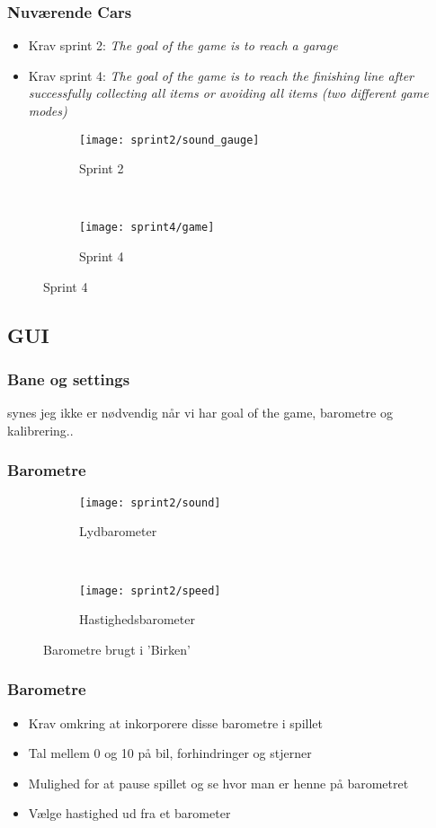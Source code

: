 \begin{frame}
\frametitle{Nuværende Cars}
\begin{itemize}
\item Krav sprint 2: \textit{The goal of the game is to reach a garage}
\item Krav sprint 4: \textit{The goal of the game is to reach the finishing line
after successfully collecting all items or avoiding
all items (two different game modes)}
\end{itemize}
\begin{figure}
\begin{subfigure}[b]{0.4\textwidth}
\texttt{[image: sprint2/sound\_gauge]}
\caption{Sprint 2}
\end{subfigure}
~
\begin{subfigure}[b]{0.4\textwidth}
\texttt{[image: sprint4/game]}
\caption{Sprint 4}
\end{subfigure}
\end{figure}
\end{frame}
\subsection{GUI}
\begin{frame}
\frametitle{Bane og settings}
synes jeg ikke er nødvendig når vi har goal of the game, barometre og kalibrering..
\end{frame}
\begin{frame}
\frametitle{Barometre}
\begin{figure}[h]
	\centering
        \begin{subfigure}[b]{0.4\textwidth}
                \texttt{[image: sprint2/sound]}
                \caption{Lydbarometer}
        \end{subfigure}%
        ~
        \begin{subfigure}[b]{0.4\textwidth}
                \texttt{[image: sprint2/speed]}
                \caption{Hastighedsbarometer}
        \end{subfigure}
        \caption{Barometre brugt i 'Birken'}
\end{figure}
\end{frame}

\begin{frame}
\frametitle{Barometre}
\begin{itemize}
\item Krav omkring at inkorporere disse barometre i spillet
\item Tal mellem 0 og 10 på bil, forhindringer og stjerner
\item Mulighed for at pause spillet og se hvor man er henne på barometret
\item Vælge hastighed ud fra et barometer
\end{itemize}
\end{frame}

